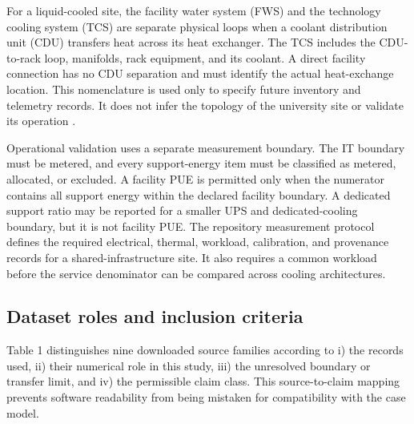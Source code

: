\documentclass[review,12pt]{elsarticle}
\begin{document}
For a liquid-cooled site, the facility water system (FWS) and the technology cooling system (TCS) are separate physical loops when a coolant distribution unit (CDU) transfers heat across its heat exchanger. The TCS includes the CDU-to-rack loop, manifolds, rack equipment, and its coolant. A direct facility connection has no CDU separation and must identify the actual heat-exchange location. This nomenclature is used only to specify future inventory and telemetry records. It does not infer the topology of the university site or validate its operation \cite{ref53,ref54,ref55,ref56}.

Operational validation uses a separate measurement boundary. The IT boundary must be metered, and every support-energy item must be classified as metered, allocated, or excluded. A facility PUE is permitted only when the numerator contains all support energy within the declared facility boundary. A dedicated support ratio may be reported for a smaller UPS and dedicated-cooling boundary, but it is not facility PUE. The repository measurement protocol defines the required electrical, thermal, workload, calibration, and provenance records for a shared-infrastructure site. It also requires a common workload before the service denominator can be compared across cooling architectures.

\subsection{Dataset roles and inclusion criteria}
Table 1 distinguishes nine downloaded source families according to i) the records used, ii) their numerical role in this study, iii) the unresolved boundary or transfer limit, and iv) the permissible claim class. This source-to-claim mapping prevents software readability from being mistaken for compatibility with the case model.
\end{document}
